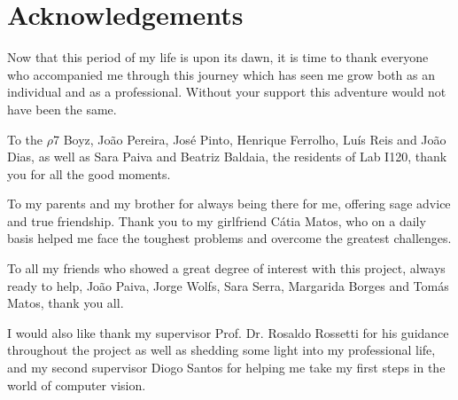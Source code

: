 \chapter*{Acknowledgements}

Now that this period of my life is upon its dawn, it is time to thank everyone who accompanied me through this journey which has seen me grow both as an individual and as a professional. Without your support this adventure would not have been the same.

To the \(\rho\)7 Boyz, João Pereira, José Pinto, Henrique Ferrolho, Luís Reis and João Dias, as well as Sara Paiva and Beatriz Baldaia, the residents of Lab I120, thank you for all the good moments.

To my parents and my brother for always being there for me, offering sage advice and true friendship. Thank you to my girlfriend Cátia Matos, who on a daily basis helped me face the toughest problems and overcome the greatest challenges.

To all my friends who showed a great degree of interest with this project, always ready to help, João Paiva, Jorge Wolfs, Sara Serra, Margarida Borges and Tomás Matos, thank you all. 

I would also like thank my supervisor Prof. Dr. Rosaldo Rossetti for his guidance throughout the project as well as shedding some light into my professional life, and my second supervisor Diogo Santos for helping me take my first steps in the world of computer vision.

\vspace{10mm}
